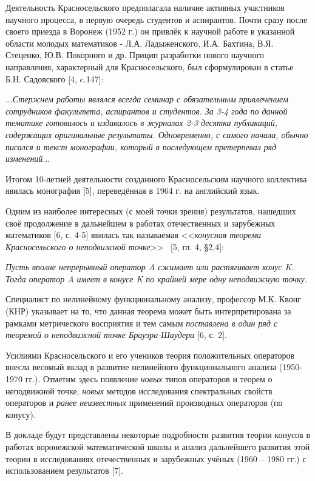 	Деятельность Красносельского предполагала наличие активных участников научного процесса, в первую очередь студентов и аспирантов. Почти сразу после своего приезда в Воронеж (1952 г.) он привлёк к научной работе в указанной области молодых математиков - Л.А. Ладыженского, И.А. Бахтина, В.Я. Стеценко, Ю.В. Покорного и др. Прицип разработки нового научного направления, характерный для Красносельского, был сформулирован в статье Б.Н. Садовского [4, c.147]:
	
	{\textquotedbl}
	...\textit{Стержнем работы являлся всегда семинар с обязательным привлечением сотрудников факультета, аспирантов и студентов. За 3-4 года по данной тематике готовилось и издавалось в журналах 2-3 десятка публикаций, содержащих оригинальные результаты. Одновременно, с самого начала, обычно писался и текст монографии, который в последующем претерпевал ряд изменений}...
	{\textquotedbl}
	
Итогом 10-летней деятельности созданного Красносельским научного коллектива явилась монография [5], переведённая в 1964 г. на английский язык.

Одним из наиболее интересных (с моей точки зрения) результатов, нашедших своё продолжение в дальнейшем в работах отечественных и зарубежных математиков [6, с. 4-5] явилась так называемая <<\textit{конусная теорема Красносельского о неподвижной точке}>> \, [5, гл. 4, §2,4]:

\textit{Пусть вполне непрерывный оператор A сжимает или растягивает конус K. Тогда оператор A имеет в конусе K по крайней мере одну неподвижную точку.}

Специалист по нелинейному функциональному анализу, профессор М.К. Квонг (КНР) указывает на то, что данная теорема может быть интерпретирована за рамками метрического восприятия и тем самым \textit{поставлена в один ряд с теоремой о неподвижной точке Брауэра-Шаудера} [6, с. 2].

Усилиями Красносельского и его учеников теория положительных операторов внесла весомый вклад в развитие нелинейного функционального анализа (1950-1970 гг.). Отметим здесь появление \textit{новых} типов операторов и теорем о неподвижной точке, \textit{новых}	 методов исследования спектральных свойств операторов и\textit{ ранее неизвестных} применений производных операторов (по конусу).

В докладе будут представлены некоторые подробности развития теории конусов в работах воронежской математической школы и анализ дальнейшего развития этой теории в исследованиях отечественных и зарубежных учёных (1960 -- 1980 гг.) с использованием результатов [7].


